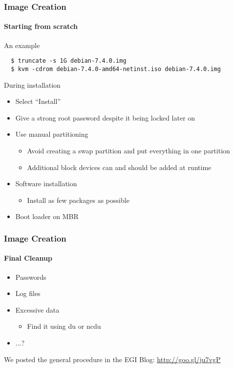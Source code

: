 \begin{frame}[fragile]
\frametitle{Image Creation}
\framesubtitle{Starting from scratch}
An example
\begin{lstlisting}
  $ truncate -s 1G debian-7.4.0.img
  $ kvm -cdrom debian-7.4.0-amd64-netinst.iso debian-7.4.0.img
\end{lstlisting}
During installation
\begin{itemize}
\item Select ``Install''
\item Give a strong root password despite it being locked later on
\item Use manual partitioning
  \begin{itemize}
  \item Avoid creating a swap partition and put everything in one partition
  \item Additional block devices can and should be added at runtime
  \end{itemize}
\item Software installation
  \begin{itemize}
  \item Install as few packages as possible
  \end{itemize}
\item Boot loader on MBR
\end{itemize}
\end{frame}

\begin{frame}
\frametitle{Image Creation}
\framesubtitle{Final Cleanup}
\begin{itemize}
\item Passwords
\item Log files
\item Excessive data
  \begin{itemize}
  \item Find it using du or ncdu
  \end{itemize}
\item ...?
\end{itemize}
We posted the general procedure in the EGI Blog: \url{http://goo.gl/ju7vgP}
\end{frame}

